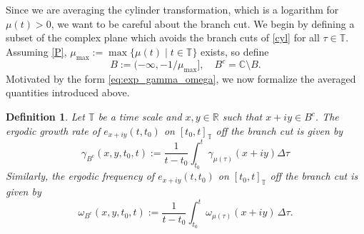 \documentclass[10pt,a4paper]{amsart}
\numberwithin{equation}{section}
\newtheorem{definition}[theorem]{Definition}
\begin{document}
Since we are averaging the cylinder transformation, which is a logarithm for
$\mu(t)>0$, we want to be careful about the branch cut. We begin by defining a subset
of the complex plane which avoids the branch cuts of \eqref{cyl} for all $\tau\in\mathbb{T}$.
Assuming \eqref{P}, $\mu_{\max}:=\max \{ \mu(t) \mid t \in \mathbb{T} \}$ exists, so define
\[
 B:= (-\infty, -1/\mu_{\max}],\quad
 B^c= \mathbb{C} \setminus B.
\]
Motivated by the form \eqref{eq:exp_gamma_omega}, we now formalize the averaged
quantities introduced above.

\begin{definition}
\label{def_gamma_omega} \rm
Let $\mathbb{T}$ be a time scale and $x,y \in \mathbb{R}$ such that $x+iy \in B^c$.
The \emph{ergodic growth rate of $e_{x+iy}(t,t_0)$ on $[t_0,t]_\mathbb{T}$ off the branch cut}
is given by
\begin{equation}
 \label{eq:gammatt0}
 \gamma_{B^c}(x,y,t_0,t) :=\frac{1}{t-t_0}\int_{t_0}^{t} \gamma_{\mu(\tau)}(x+iy)
 \Delta \tau
\end{equation}
Similarly, the \emph{ergodic frequency of $e_{x+iy}(t,t_0)$ on $[t_0,t]_\mathbb{T}$ off the
branch cut} is given by
 \begin{equation}
 \omega_{B^c}(x,y,t_0,t) := \frac{1}{t-t_0}\int_{t_0}^{t}
 \omega_{\mu(\tau)}(x+iy)\,\Delta \tau.\label{w}
 \end{equation}
\end{definition}
\end{document}
